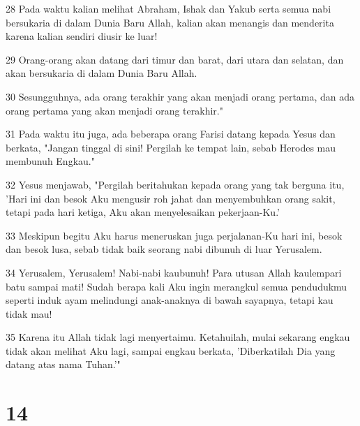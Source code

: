 \par 28 Pada waktu kalian melihat Abraham, Ishak dan Yakub serta semua nabi bersukaria di dalam Dunia Baru Allah, kalian akan menangis dan menderita karena kalian sendiri diusir ke luar!
\par 29 Orang-orang akan datang dari timur dan barat, dari utara dan selatan, dan akan bersukaria di dalam Dunia Baru Allah.
\par 30 Sesungguhnya, ada orang terakhir yang akan menjadi orang pertama, dan ada orang pertama yang akan menjadi orang terakhir."
\par 31 Pada waktu itu juga, ada beberapa orang Farisi datang kepada Yesus dan berkata, "Jangan tinggal di sini! Pergilah ke tempat lain, sebab Herodes mau membunuh Engkau."
\par 32 Yesus menjawab, "Pergilah beritahukan kepada orang yang tak berguna itu, 'Hari ini dan besok Aku mengusir roh jahat dan menyembuhkan orang sakit, tetapi pada hari ketiga, Aku akan menyelesaikan pekerjaan-Ku.'
\par 33 Meskipun begitu Aku harus meneruskan juga perjalanan-Ku hari ini, besok dan besok lusa, sebab tidak baik seorang nabi dibunuh di luar Yerusalem.
\par 34 Yerusalem, Yerusalem! Nabi-nabi kaubunuh! Para utusan Allah kaulempari batu sampai mati! Sudah berapa kali Aku ingin merangkul semua pendudukmu seperti induk ayam melindungi anak-anaknya di bawah sayapnya, tetapi kau tidak mau!
\par 35 Karena itu Allah tidak lagi menyertaimu. Ketahuilah, mulai sekarang engkau tidak akan melihat Aku lagi, sampai engkau berkata, 'Diberkatilah Dia yang datang atas nama Tuhan.'"

\chapter{14}

